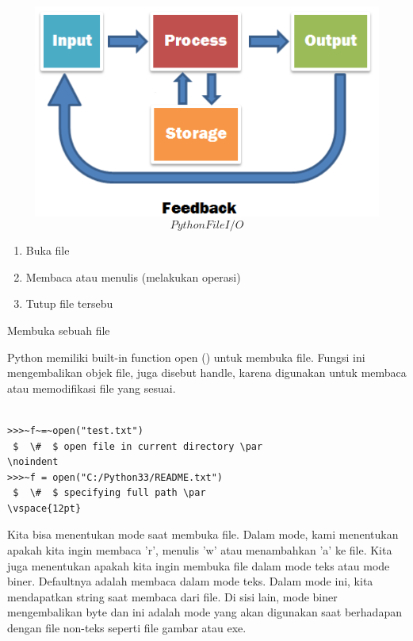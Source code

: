 \includegraphics[width=15cm,height=7cm]{Gambar/dapi8.jpg}
\begin{equation}Python File I/O\end{equation}


\begin{enumerate}
	


	\item Buka file 

	\item Membaca atau menulis (melakukan operasi) 
	\item Tutup file tersebu 
	\end {enumerate}
\vspace{12pt}
\vspace{12pt}
\vspace{12pt}
\noindent 
Membuka sebuah file \par
\noindent 
Python memiliki built-in function open () untuk membuka file. Fungsi ini mengembalikan objek file, juga disebut handle, karena digunakan untuk membaca atau memodifikasi file yang sesuai. \par
\vspace{12pt}
\noindent 

\begin{verbatim}

>>>~f~=~open("test.txt")    
 $  \#  $ open file in current directory \par
\noindent 
>>>~f = open("C:/Python33/README.txt")  
 $  \#  $ specifying full path \par
\vspace{12pt}

\end{verbatim}

Kita bisa menentukan mode saat membuka file. Dalam mode, kami menentukan apakah kita ingin membaca 'r', menulis 'w' atau menambahkan 'a' ke file. Kita juga menentukan apakah kita ingin membuka file dalam mode teks atau mode biner. Defaultnya adalah membaca dalam mode teks. Dalam mode ini, kita mendapatkan string saat membaca dari file. Di sisi lain, mode biner mengembalikan byte dan ini adalah mode yang akan digunakan saat berhadapan dengan file non-teks seperti file gambar atau exe. \par
\vspace{12pt}
\vspace{12pt}
\noindent 

